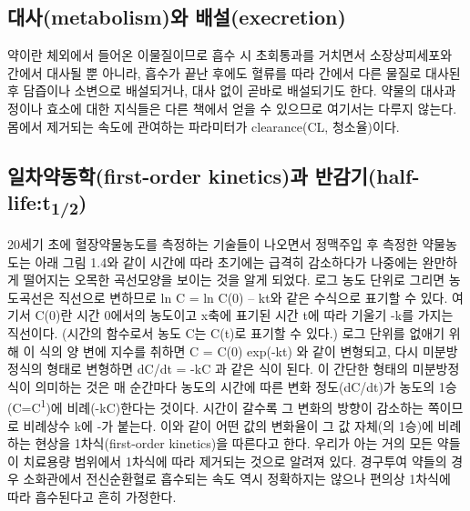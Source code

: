 \documentclass[
  11pt,
  krantz2, a4paper, twoside]{krantz}
\begin{document}
\hypertarget{uxb300uxc0acmetabolismuxc640-uxbc30uxc124execretion}{%
\subsection{대사(metabolism)와 배설(execretion)}\label{uxb300uxc0acmetabolismuxc640-uxbc30uxc124execretion}}

약이란 체외에서 들어온 이물질이므로 흡수 시 초회통과를 거치면서
소장상피세포와 간에서 대사될 뿐 아니라, 흡수가 끝난 후에도 혈류를 따라
간에서 다른 물질로 대사된 후 담즙이나 소변으로 배설되거나, 대사 없이
곧바로 배설되기도 한다. 약물의 대사과정이나 효소에 대한 지식들은 다른
책에서 얻을 수 있으므로 여기서는 다루지 않는다. 몸에서 제거되는 속도에
관여하는 파라미터가 clearance(CL, 청소율)이다.

\hypertarget{uxc77cuxcc28uxc57duxb3d9uxd559first-order-kineticsuxacfc-uxbc18uxac10uxae30half-lifet12}{%
\subsection{\texorpdfstring{일차약동학(first-order kinetics)과 반감기(half-life:t\textsubscript{1/2})}{일차약동학(first-order kinetics)과 반감기(half-life:t1/2)}}\label{uxc77cuxcc28uxc57duxb3d9uxd559first-order-kineticsuxacfc-uxbc18uxac10uxae30half-lifet12}}

20세기 초에 혈장약물농도를 측정하는 기술들이 나오면서 정맥주입 후 측정한
약물농도는 아래 그림 1.4와 같이 시간에 따라 초기에는 급격히 감소하다가
나중에는 완만하게 떨어지는 오목한 곡선모양을 보이는 것을 알게 되었다.
로그 농도 단위로 그리면 농도곡선은 직선으로 변하므로 ln C = ln C(0) --
kt와 같은 수식으로 표기할 수 있다. 여기서 C(0)란 시간 0에서의 농도이고
x축에 표기된 시간 t에 따라 기울기 -k를 가지는 직선이다. (시간의 함수로서
농도 C는 C(t)로 표기할 수 있다.) 로그 단위를 없애기 위해 이 식의 양 변에
지수를 취하면 C = C(0) exp(-kt) 와 같이 변형되고, 다시 미분방정식의
형태로 변형하면 dC/dt = -kC 과 같은 식이 된다. 이 간단한 형태의
미분방정식이 의미하는 것은 매 순간마다 농도의 시간에 따른 변화
정도(dC/dt)가 농도의 1승(C=C\textsuperscript{1})에 비례(-kC)한다는 것이다. 시간이 갈수록
그 변화의 방향이 감소하는 쪽이므로 비례상수 k에 -가 붙는다. 이와 같이
어떤 값의 변화율이 그 값 자체(의 1승)에 비례하는 현상을
1차식(first-order kinetics)을 따른다고 한다. 우리가 아는 거의 모든
약들이 치료용량 범위에서 1차식에 따라 제거되는 것으로 알려져 있다.
경구투여 약들의 경우 소화관에서 전신순환혈로 흡수되는 속도 역시
정확하지는 않으나 편의상 1차식에 따라 흡수된다고 흔히 가정한다.
\end{document}
